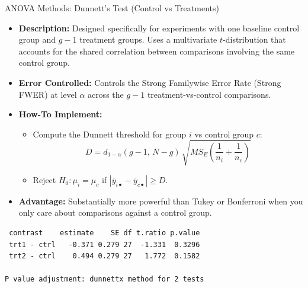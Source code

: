 \begin{frame}{ANOVA Methods: Dunnett's Test (Control vs Treatments)}
  \begin{itemize}
    \item \textbf{Description:} Designed specifically for experiments with one baseline control group and $g - 1$ treatment groups. 
    Uses a multivariate $t$-distribution that accounts for the shared correlation between comparisons involving the same control group.
    \item \textbf{Error Controlled:} Controls the \alert{Strong Familywise Error Rate (Strong FWER)} at level $\alpha$ across the $g - 1$ treatment-vs-control comparisons.
    \item \textbf{How-To Implement:}
    \begin{itemize}
      \item Compute the Dunnett threshold for group $i$ vs control group $c$:
      $$
      D = d_{1-\alpha}(g-1, \, N-g) \, \sqrt{MS_E \left(\frac{1}{n_i} + \frac{1}{n_c}\right)}
      $$
      \item Reject $H_0: \mu_i = \mu_c$ if $|\bar{y}_{i\bullet} - \bar{y}_{c\bullet}| \ge D$.
    \end{itemize}
    \item \textbf{Advantage:} Substantially more powerful than Tukey or Bonferroni when you only care about comparisons against a control group.
  \end{itemize}
  
  
\begin{knitrout}\small
{}\color{fgcolor}\begin{kframe}
\begin{alltt}

 \hlkwb{<-} \hldef{(}
   \hldef{=} \hldef{,}
   \hldef{=} 
\hldef{)}
\end{alltt}
\begin{verbatim}
 contrast    estimate    SE df t.ratio p.value
 trt1 - ctrl   -0.371 0.279 27  -1.331  0.3296
 trt2 - ctrl    0.494 0.279 27   1.772  0.1582

P value adjustment: dunnettx method for 2 tests 
\end{verbatim}
\end{kframe}
\end{knitrout}


\end{frame}
